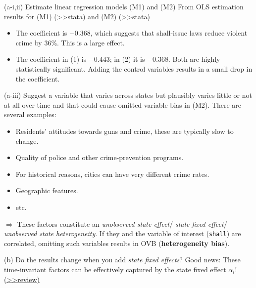 \documentclass[
  10pt,
  ignorenonframetext,
]{beamer}
\begin{document}
\begin{frame}{(a-i,ii) Estimate linear regression models (M1) and (M2)}
\protect\hypertarget{Ex1-pooledOLS-A}{}
From OLS estimation results for (M1)
\footnotesize \protect\hyperlink{Ex1-pooledsimple}{(\textgreater\textgreater stata)}
\normalsize and (M2)
\footnotesize \protect\hyperlink{Ex1-pooledwithctrls}{(\textgreater\textgreater stata)}
\normalsize

\begin{itemize}
\item
  The coefficient is \(-0.368\), which suggests that shall-issue laws
  reduce violent crime by \(36\%\). This is a large effect.
\item
  The coefficient in (1) is \(-0.443\); in (2) it is \(-0.368\). Both
  are highly statistically significant. Adding the control variables
  results in a small drop in the coefficient.
\end{itemize}
\end{frame}

\begin{frame}[fragile]{(a-iii) Suggest a variable that varies across
states but plausibly varies little or not at all over time and that
could cause omitted variable bias in (M2).}
\protect\hypertarget{a-iii-suggest-a-variable-that-varies-across-states-but-plausibly-varies-little-or-not-at-all-over-time-and-that-could-cause-omitted-variable-bias-in-m2.}{}
There are several examples:

\begin{itemize}
\item
  Residents' attitudes towards guns and crime, these are typically slow
  to change.
\item
  Quality of police and other crime-prevention programs.
\item
  For historical reasons, cities can have very different crime rates.
\item
  Geographic features.
\item
  etc.
\end{itemize}

\(\Longrightarrow\) These factors constitute an \emph{unobserved state
effect}/ \emph{state fixed effect}/ \emph{unobserved state
heterogeneity}. If they and the variable of interest (\texttt{shall})
are correlated, omitting such variables results in OVB
(\textbf{heterogeneity bias}).
\end{frame}

\begin{frame}{(b) Do the results change when you add \emph{state fixed
effects}?}
\protect\hypertarget{b-do-the-results-change-when-you-add-state-fixed-effects}{}
Good news: These time-invariant factors can be effectively captured by
the state fixed effect \(\alpha_i\)!
\footnotesize \protect\hyperlink{EntityFEs}{(\textgreater\textgreater review)}
\normalsize
\end{frame}
\end{document}
